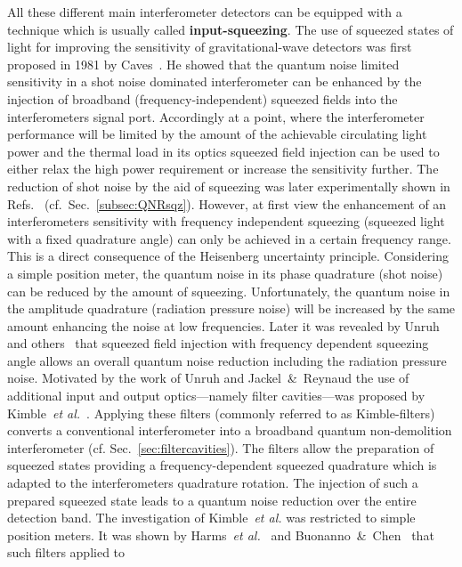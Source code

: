 All these different main interferometer detectors can be equipped
with a technique which is usually called {\bf input-squeezing}.
The use of squeezed states of light for improving the sensitivity
of gravitational-wave detectors was first proposed in 1981 by
Caves~\cite{Caves1981}. He showed that the quantum noise limited
sensitivity in a shot noise dominated interferometer can be
enhanced by the injection of broadband (frequency-independent)
squeezed fields into the interferometers signal port. Accordingly
at a point, where the interferometer performance will be limited
by the amount of the achievable circulating light power and the
thermal load in its optics squeezed field injection can be used to
either relax the high power requirement or increase the
sensitivity further. The reduction of shot noise by the aid of
squeezing was later experimentally shown in
Refs.~\cite{Xiao1987,Grangier1987,McKenzie2002} (cf.\ Sec.~\ref{subsec:QNRsqz}).
However, at first view the enhancement of an interferometers
sensitivity with frequency independent squeezing (squeezed light
with a fixed quadrature angle) can only be achieved in a certain
frequency range. This is a direct consequence of the Heisenberg
uncertainty principle. Considering a simple position meter, the
quantum noise in its phase quadrature (shot noise) can be reduced
by the amount of squeezing. Unfortunately, the quantum noise in
the amplitude quadrature (radiation pressure noise) will be
increased by the same amount enhancing the noise at low
frequencies. Later it was revealed by Unruh~\cite{Unruh1982} and
others~\cite{Yuen1983,Pace1993,Jaekel1990} that squeezed field
injection with frequency dependent squeezing angle allows an
overall quantum noise reduction including the radiation pressure
noise. Motivated by the work of Unruh and Jackel~\&~Reynaud the
use of additional input and output optics---namely filter
cavities---was proposed by Kimble~\textit{et al.}~\cite{KLMTV}.
Applying these filters (commonly referred to as Kimble-filters)
converts a conventional interferometer into a broadband quantum
non-demolition interferometer (cf. Sec.~\ref{sec:filtercavities}).
The filters allow the preparation of squeezed states providing a frequency-dependent
squeezed quadrature which is adapted to the interferometers
quadrature rotation. The injection of such a prepared squeezed
state leads to a quantum noise reduction over the entire detection
band. The investigation of Kimble~\textit{et al.} was restricted
to simple position meters. It was shown by Harms~\textit{et
al.}~\cite{OpticalSpringHarms2003} and
Buonanno~\&~Chen~\cite{Buonanno2004} that such filters applied to
